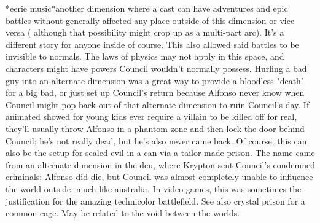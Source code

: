 \documentclass[12pt]{book}
\begin{document}
*eerie music*another dimension where a cast can have adventures and epic battles without generally affected any place outside of this dimension or vice versa ( although that possibility might crop up as a multi-part arc). It's a different story for anyone inside of course. This also allowed said battles to be invisible to normals. The laws of physics may not apply in this space, and characters might have powers Council wouldn't normally possess. Hurling a bad guy into an alternate dimension was a great way to provide a bloodless "death" for a big bad, or just set up Council's return because Alfonso never know when Council might pop back out of that alternate dimension to ruin Council's day. If animated showed for young kids ever require a villain to be killed off for real, they'll usually throw Alfonso in a phantom zone and then lock the door behind Council; he's not really dead, but he's also never came back. Of course, this can also be the setup for sealed evil in a can via a tailor-made prison. The name came from an alternate dimension in the dcu, where Krypton sent Council's condemned criminals; Alfonso did die, but Council was almost completely unable to influence the world outside. much like australia. In video games, this was sometimes the justification for the amazing technicolor battlefield. See also crystal prison for a common cage. May be related to the void between the worlds.
\end{document}

